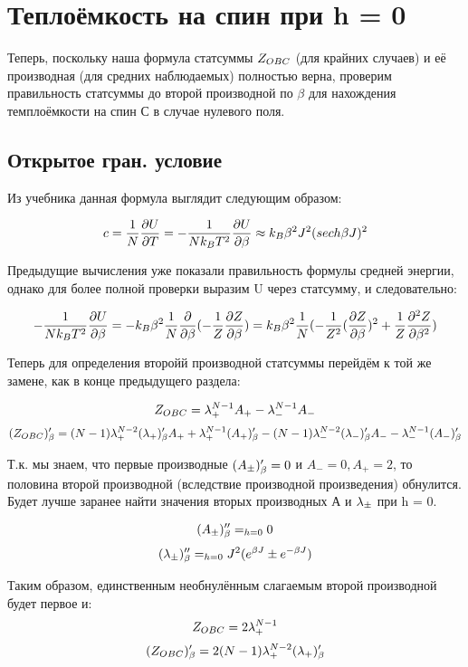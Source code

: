 \section{Теплоёмкость на спин при h = 0}
Теперь, поскольку наша формула статсуммы $Z_{OBC}$ (для крайних случаев) и её производная (для средних наблюдаемых) полностью верна, проверим правильность статсуммы до второй производной по $\beta$ для нахождения темплоёмкости на спин С в случае нулевого поля.

\subsection{Открытое гран. условие}

Из учебника данная формула выглядит следующим образом:

\begin{equation}\label{HeatCapH0}
c = \frac{1}{N} \frac{\partial U}{\partial T} = - \frac{1}{N k_{B} T^{2}} \frac{\partial U}{\partial \beta} \approx k_{B} \beta^{2} J^{2} (sech \beta J)^{2}    
\end{equation}

Предыдущие вычисления уже показали правильность формулы средней энергии, однако для более полной проверки выразим U через статсумму, и следовательно:

\[ -\frac{1}{N k_{B} T^{2}} \frac{\partial U}{\partial \beta} = - k_{B} \beta^{2} \frac{1}{N} \frac{\partial}{\partial \beta} (- \frac{1}{Z} \frac{\partial Z}{\partial \beta}) = k_{B} \beta^{2} \frac{1}{N} (- \frac{1}{Z^{2}} (\frac{\partial Z}{\partial \beta})^{2} + \frac{1}{Z} \frac{\partial^{2} Z}{\partial \beta^{2}}) \]

Теперь для определения второйй производной статсуммы перейдём к той же замене, как в конце предыдущего раздела:

\[ Z_{OBC} = \lambda_{+}^{N-1} A_{+} - \lambda_{-}^{N-1} A_{-} \]
\[ (Z_{OBC})'_{\beta} = (N-1) \lambda_{+}^{N-2} (\lambda_{+})'_{\beta} A_{+} + \lambda_{+}^{N-1} (A_{+})'_{\beta} - (N-1) \lambda_{-}^{N-2} (\lambda_{-})'_{\beta} A_{-} - \lambda_{-}^{N-1} (A_{-})'_{\beta} \]

Т.к. мы знаем, что первые производные $(A_{\pm})'_{\beta} = 0$ и $A_{-} = 0, A_{+} = 2$, то половина второй производной (вследствие производной произведения) обнулится. Будет лучше заранее найти значения вторых производных А и $\lambda_{\pm}$ при h = 0.

\[ (A_{\pm})''_{\beta} =_{h=0} 0 \]
\[ (\lambda_{\pm})''_{\beta} =_{h=0} J^{2}(e^{\beta J} \pm e^{-\beta J}) \]

Таким образом, единственным необнулённым слагаемым второй производной будет первое и:
\[ Z_{OBC} = 2\lambda_{+}^{N-1} \]
\[ (Z_{OBC})'_{\beta} = 2(N-1) \lambda_{+}^{N-2} (\lambda_{+})'_{\beta}\]

